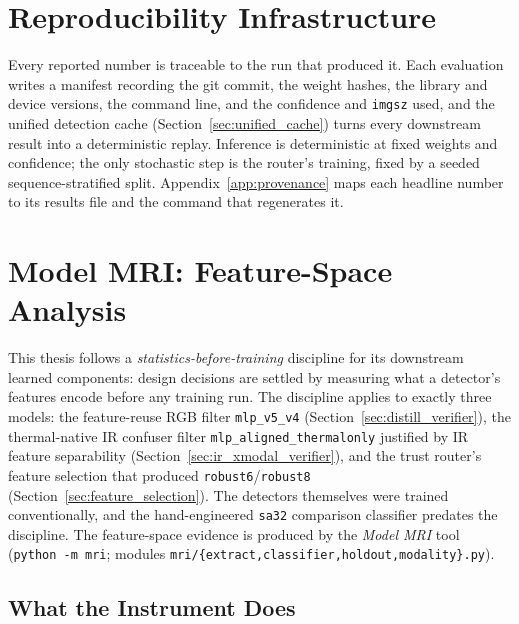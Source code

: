 \section{Reproducibility Infrastructure}
\label{sec:reproducibility}

Every reported number is traceable to the run that produced it. Each evaluation writes a manifest recording the git commit, the weight hashes, the library and device versions, the command line, and the confidence and \texttt{imgsz} used, and the unified detection cache (Section~\ref{sec:unified_cache}) turns every downstream result into a deterministic replay. Inference is deterministic at fixed weights and confidence; the only stochastic step is the router's training, fixed by a seeded sequence-stratified split. Appendix~\ref{app:provenance} maps each headline number to its results file and the command that regenerates it.

\section{Model MRI: Feature-Space Analysis}
\label{sec:model_mri}

This thesis follows a \emph{statistics-before-training} discipline for its downstream learned components: design decisions are settled by measuring what a detector's features encode before any training run. The discipline applies to exactly three models: the feature-reuse RGB filter \texttt{mlp\_v5\_v4} (Section~\ref{sec:distill_verifier}), the thermal-native IR confuser filter \texttt{mlp\_aligned\_thermalonly} justified by IR feature separability (Section~\ref{sec:ir_xmodal_verifier}), and the trust router's feature selection that produced \texttt{robust6}/\texttt{robust8} (Section~\ref{sec:feature_selection}). The detectors themselves were trained conventionally, and the hand-engineered \texttt{sa32} comparison classifier predates the discipline. The feature-space evidence is produced by the \emph{Model MRI} tool (\texttt{python -m mri}; modules \texttt{mri/\{extract,\allowbreak classifier,\allowbreak holdout,\allowbreak modality\}.py}).

\subsection{What the Instrument Does}

